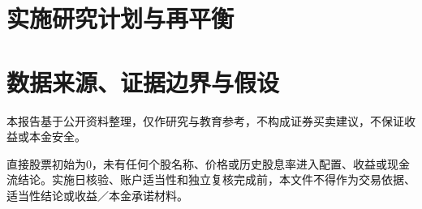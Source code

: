 \documentclass[a4paper,11pt,openany,fontset=none]{ctexrep}
\newcommand{\reportdisclaimer}{本报告基于公开资料整理，仅作研究与教育参考，不构成证券买卖建议，不保证收益或本金安全。}
\begin{document}
\chapter{实施研究计划与再平衡}


\appendix
\begingroup
\small
\chapter{数据来源、证据边界与假设}


\medskip
\begin{disclosurebox}[重要披露]
\footnotesize
\reportdisclaimer\par
直接股票初始为0，未有任何个股名称、价格或历史股息率进入配置、收益或现金流结论。实施日核验、账户适当性和独立复核完成前，本文件不得作为交易依据、适当性结论或收益／本金承诺材料。
\end{disclosurebox}
\endgroup
\end{document}
